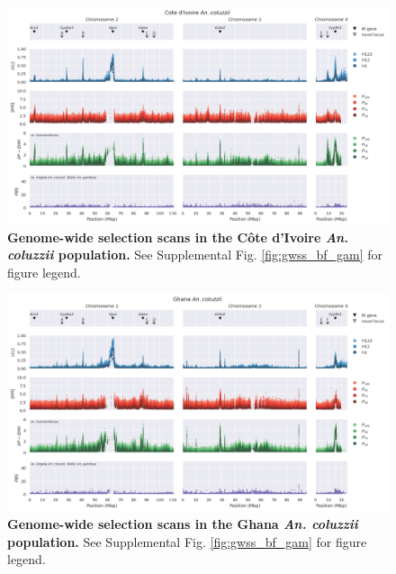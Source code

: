 \documentclass[a4paper,11pt,abstracton,hidelinks]{scrartcl}
\begin{document}
\begin{landscape}
\begin{figure}[t!]
	\begin{center}
		\includegraphics*[width=1\linewidth,center]{artwork/gwss_ci_col_gw_ao_col_gq_gam.png}
	\end{center}
	\caption{
	\textbf{Genome-wide selection scans in the C\^{o}te d'Ivoire \textit{An. coluzzii} population.} 
	See Supplemental Fig. \ref{fig:gwss_bf_gam} for figure legend.
	} 
	\label{fig:gwss_ci_col}
\end{figure}


\begin{figure}[t!]
	\begin{center}
		\includegraphics*[width=1\linewidth,center]{artwork/gwss_gh_col_gw_ao_col_gq_gam.png}
	\end{center}
	\caption{
	\textbf{Genome-wide selection scans in the Ghana \textit{An. coluzzii} population.} 
	See Supplemental Fig. \ref{fig:gwss_bf_gam} for figure legend.
	} 
	\label{fig:gwss_gh_col}
\end{figure}



\end{landscape}
\end{document}

